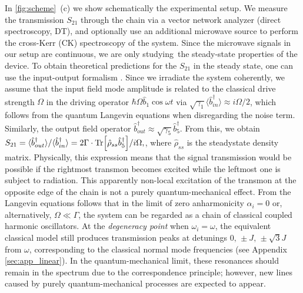 \documentclass[%
 aps, pra,
 amsmath,amssymb,
 reprint,%
superscriptaddress
]{revtex4-2}
\begin{document}
In \autoref{fig:scheme}~(c) we show schematically the experimental setup. We measure the transmission $S_{21}$ through the chain via a vector network analyzer (direct spectroscopy, DT), and optionally use an additional microwave source to perform the cross-Kerr (CK) spectroscopy of the system. Since the microwave signals in our setup are continuous, we are only studying the steady-state properties of the device. To obtain theoretical predictions for the $S_{21}$ in the steady state, one can use the input-output formalism \cite{yurke1984quantum,gardiner1985input}. Since we irradiate the system coherently, we assume that the input field mode amplitude is related to the classical drive strength $\Omega$ in the driving operator $\hbar \Omega \hat b_1 \cos \omega t$ via $\sqrt{\gamma_1} \langle  \hat b_{in}^\dag \rangle \approx i \Omega/2$, which follows from the quantum Langevin equations when disregarding the noise term. Similarly, the output field operator $\hat b_{out}^\dag \approx \sqrt{\gamma_5} \hat b_5^\dag$. From this, we obtain $
	S_{21} = \langle \hat b_{out}^\dag\rangle / \langle \hat b_{in}^\dag \rangle = 2\Gamma\cdot \Tr[\hat \rho_{ss} \hat b_5^\dag]/{i\Omega} ,
$,
where $\hat \rho_{ss}$ is the steadystate density matrix. Physically, this expression means that the signal transmission would be possible if the rightmost transmon becomes excited while the leftmost one is subject to radiation. This apparently non-local excitation of the transmon at the opposite edge of the chain is not a purely quantum-mechanical effect. From the Langevin equations follows that in the limit of zero anharmonicity $\alpha_i = 0$ or, alternatively, $\Omega \ll \Gamma$, the system can be regarded as a chain of classical coupled harmonic oscillators. At the \textit{degeneracy point} when $\omega_i = \omega$, the equivalent classical model still produces transmission peaks at detunings $0,\, \pm J,\, \pm \sqrt{3} J$ from $\omega$, corresponding to the classical normal mode frequencies (see Appendix \ref{sec:app_linear}). In the quantum-mechanical limit, these resonances should remain in the spectrum due to the correspondence principle; however, new lines caused by purely quantum-mechanical processes are expected to appear.
\end{document}
